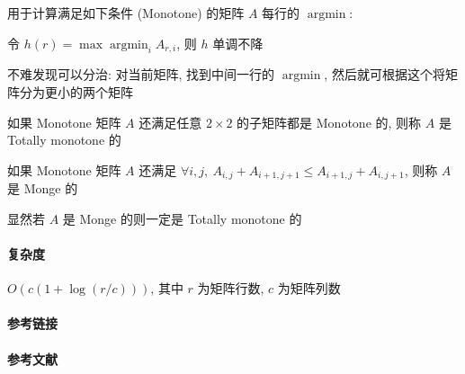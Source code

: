 用于计算满足如下条件 (Monotone) 的矩阵 \(A\) 每行的 \(\operatorname{argmin}\):

\begin{center}
    令 \(h(r) = \max \operatorname{argmin}_i A_{r,i}\), 则 \(h\) 单调不降
\end{center}

不难发现可以分治: 对当前矩阵, 找到中间一行的 \(\operatorname{argmin}\), 然后就可根据这个将矩阵分为更小的两个矩阵

如果 Monotone 矩阵 \(A\) 还满足任意 \(2\times 2\) 的子矩阵都是 Monotone 的, 则称 \(A\) 是 Totally monotone 的

如果 Monotone 矩阵 \(A\) 还满足 \(\forall i,j,~A_{i,j}+A_{i+1,j+1}\leq A_{i+1,j}+A_{i,j+1}\), 则称 \(A\) 是 Monge 的

显然若 \(A\) 是 Monge 的则一定是 Totally monotone 的

\paragraph{复杂度} \(O(c(1+\log(r/c)))\), 其中 \(r\) 为矩阵行数, \(c\) 为矩阵列数

\paragraph{参考链接}  

\paragraph{参考文献} \cite{aggarwal1986geometric} \cite{enwiki:1033199110}
